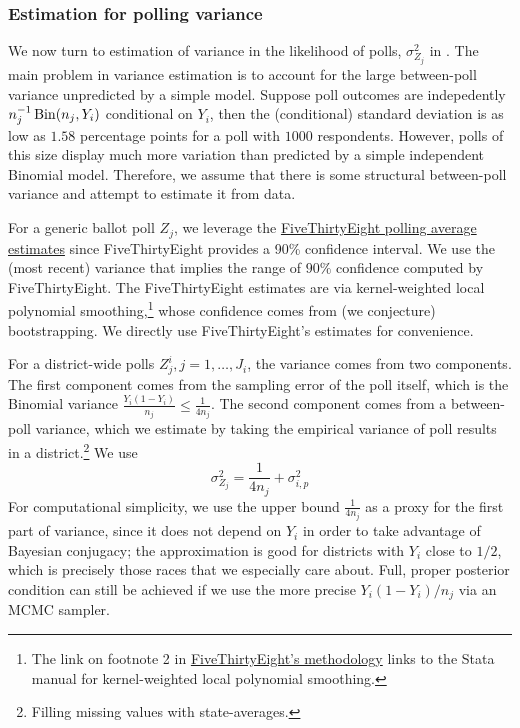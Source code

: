 \documentclass[11pt]{article}
\begin{document}
\subsubsection{Estimation for polling variance}

We now turn to estimation of variance in the likelihood of polls, $\sigma_{Z_j}^2$ in . The main problem in variance estimation is to account for the large between-poll variance unpredicted by a simple model. Suppose poll outcomes are indepedently $n_j^{-1} \operatorname{Bin}(n_j, Y_i)$ conditional on $Y_i$, then the (conditional) standard deviation is as low as $1.58$ percentage points for a poll with $1000$ respondents. However, polls of this size display much more variation than predicted by a simple independent Binomial model. Therefore, we assume that there is some structural between-poll variance and attempt to estimate it from data.  

For a generic ballot poll $Z_j$, we leverage the \href{https://projects.fivethirtyeight.com/congress-generic-ballot-polls/}{FiveThirtyEight polling average estimates} since FiveThirtyEight provides a 90\% confidence interval. We use the (most recent) variance that implies the range of $90\%$ confidence computed by FiveThirtyEight. The FiveThirtyEight estimates are via kernel-weighted local polynomial smoothing,\footnote{The link on footnote 2 in \href{https://fivethirtyeight.com/features/heres-a-new-less-volatile-version-of-our-generic-ballot-tracker/}{FiveThirtyEight's methodology} links to the Stata manual for kernel-weighted local polynomial smoothing.} whose confidence comes from (we conjecture) bootstrapping. We directly use FiveThirtyEight's estimates for convenience. 

For a district-wide polls $Z_j^i, j = 1,\ldots,J_i$, the variance comes from two components. The first component comes from the sampling error of the poll itself, which is the Binomial variance $\frac{Y_i(1-Y_i)}{n_j} \le \frac{1}{4n_j}$. The second component comes from a between-poll variance, which we estimate by taking the empirical variance of poll results in a district.\footnote{Filling missing values with state-averages.} We use \[
\sigma^2_{Z_j} = \frac{1}{4n_j} + \sigma^2_{i,p} \tag{Estimation for district poll variance}
\]
For computational simplicity, we use the upper bound $\frac{1}{4n_j}$ as a proxy for the first part of variance, since it does not depend on $Y_i$ in order to take advantage of Bayesian conjugacy; the approximation is good for districts with $Y_i$ close to $1/2$, which is precisely those races that we especially care about. Full, proper posterior condition can still be achieved if we use the more precise $Y_i(1-Y_i)/n_j$ via an MCMC sampler. 
\end{document}
